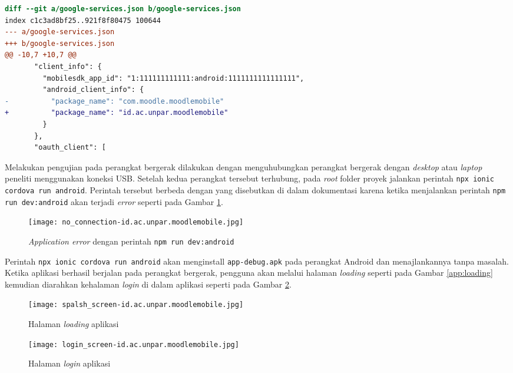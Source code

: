 \begin{lstlisting}[language = diff, frame=single, label ={google-service.json}, caption = Menyesuaikan \texttt{package\_name} dengan \texttt{app\_id} pada \texttt{google-service.json} ]
diff --git a/google-services.json b/google-services.json
index c1c3ad8bf25..921f8f80475 100644
--- a/google-services.json
+++ b/google-services.json
@@ -10,7 +10,7 @@
       "client_info": {
         "mobilesdk_app_id": "1:111111111111:android:1111111111111111",
         "android_client_info": {
-          "package_name": "com.moodle.moodlemobile"
+          "package_name": "id.ac.unpar.moodlemobile"
         }
       },
       "oauth_client": [
\end{lstlisting}

Melakukan pengujian pada perangkat bergerak dilakukan dengan menguhubungkan perangkat bergerak dengan \textit{desktop} atau \textit{laptop} peneliti menggunakan koneksi USB. Setelah kedua perangkat tersebut terhubung, pada \textit{root} folder proyek jalankan perintah \texttt{npx ionic cordova run android}. Perintah tersebut berbeda dengan yang disebutkan di dalam dokumentasi karena ketika menjalankan perintah \texttt{npm run dev:android} akan terjadi \textit{error} seperti pada Gambar \ref{app:error:no-connection}.

\begin{figure}[H] 
	\centering  
	\texttt{[image: no\_connection-id.ac.unpar.moodlemobile.jpg]}  
	\caption[\textit{Application error} dengan perintah \texttt{npm run dev:android}] {\textit{Application error} dengan perintah \texttt{npm run dev:android}} 
	\label{app:error:no-connection} 
\end{figure} 

Perintah \texttt{npx ionic cordova run android} akan menginstall \texttt{app-debug.apk} pada perangkat Android dan menajlankannya tanpa masalah. Ketika aplikasi berhasil berjalan pada perangkat bergerak, pengguna akan melalui halaman \textit{loading} seperti pada Gambar \ref{app:loading} kemudian diarahkan kehalaman \textit{login} di dalam aplikasi seperti pada Gambar \ref{app:login}.


\begin{figure}[H]
\begin{minipage}{.5\textwidth} 
	\centering  
	\texttt{[image: spalsh\_screen-id.ac.unpar.moodlemobile.jpg]}  
	\caption[Halaman \textit{loading} aplikasi] {Halaman \textit{loading} aplikasi} 
	\label{app:loading} 
\end{minipage}
\begin{minipage}{.5\textwidth}
	\centering  
	\texttt{[image: login\_screen-id.ac.unpar.moodlemobile.jpg]}  
	\caption[Halaman \textit{login} aplikasi] {Halaman \textit{login} aplikasi} 
	\label{app:login} 
\end{minipage}
\end{figure}

